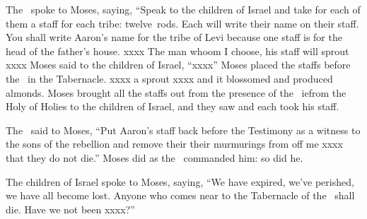 \begin{inparaenum}
   The \lord\ spoke to Moses, saying,%
   ``Speak to the children of Israel and take for each of them a staff for each tribe: twelve~rods. Each will write their name on their staff.%
   You shall write Aaron's name for the tribe of Levi because one staff is for the head of the father's house.%
   xxxx%
   The man whoom I choose, his staff will sprout xxxx%
   Moses said to the children of Israel, ``xxxx''%
   Moses placed the staffs before the \lord\ in the Tabernacle.%
   xxxx a sprout xxxx and it blossomed and produced almonds.%
   Moses brought all the staffs out from the presence of the \lord\ ie{from the Holy of Holies} to the children of Israel, and they saw and each took his staff.%
  
   The \lord\ said to Moses, ``Put Aaron's staff back before the Testimony as a witness to the sons of the rebellion and remove their their murmurings from off me xxxx that they do not die.''%
   Moses did as the \lord\ commanded him: so did he.%
  
   The children of Israel spoke to Moses, saying, ``We have expired, we've perished, we have all become lost.%
   Anyone who comes near to the Tabernacle of the \lord\ shall die. Have we not been xxxx?''%
\end{inparaenum}
